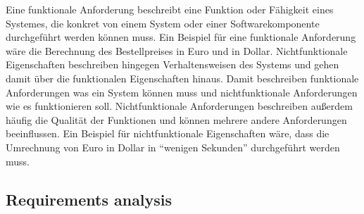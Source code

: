 Eine funktionale Anforderung beschreibt eine Funktion oder Fähigkeit eines Systemes, die konkret von einem System oder einer Softwarekomponente durchgeführt werden können muss.\autocite[Vgl.][S.35]{IEEE.1990} Ein Beispiel für eine funktionale Anforderung wäre die Berechnung des Bestellpreises in Euro und in Dollar. Nichtfunktionale Eigenschaften beschreiben hingegen Verhaltensweisen des Systems\autocite[Vgl.][Kapitel 3]{Seacord.2003} und gehen damit über die funktionalen Eigenschaften hinaus. Damit beschreiben funktionale Anforderungen was ein System können muss und nichtfunktionale Anforderungen wie es funktionieren soll. Nichtfunktionale Anforderungen beschreiben außerdem häufig die Qualität der Funktionen und können mehrere andere Anforderungen beeinflussen.\autocite[Vgl.][S.109ff]{Balzert.2011} Ein Beispiel für nichtfunktionale Eigenschaften wäre, dass die Umrechnung von Euro in Dollar in \enquote{wenigen Sekunden} durchgeführt werden muss.


\subsection{Requirements analysis}


